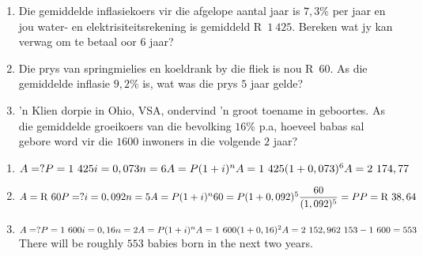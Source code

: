 \begin{exercises}{}{
    \begin{enumerate}[label=\textbf{\arabic*}.]
	\item Die gemiddelde inflasiekoers vir die afgelope aantal jaar is $7,3\%$ per jaar en jou water- en elektrisiteitsrekening is gemiddeld R~$1~425$. Bereken wat jy kan verwag om te betaal oor 6 jaar?

	\item Die prys van springmielies en koeldrank by die fliek is nou R~$60$. As die gemiddelde inflasie $9,2\%$ is, wat was die prys $5$ jaar gelde?

	\item 'n Klien dorpie in Ohio, VSA, ondervind 'n groot toename in geboortes. As die gemiddelde groeikoers van die bevolking $16\%$ p.a, hoeveel babas sal gebore word vir die $1600$ inwoners in die volgende $2$ jaar?
    \end{enumerate}
}
\end{exercises}


 \begin{solutions}{}{
\begin{enumerate}[itemsep=5pt, label=\textbf{\arabic*}. ] 


\item $A = ?\\
P=1~425\\
i=0,073\\
n=6\\
A=P(1 + i)^{n}\\
A = 1~425(1 + 0,073)^{6}\\
A = 2~174,77$
\item $A = \mbox{R }60\\
P=?\\
i=0,092\\
n=5\\
A=P(1 + i)^{n}\\
60 = P(1 + 0,092)^{5}\\
\dfrac{60}{(1,092)^5}=P\\
P = \mbox{R }38,64$
\item $A = ?\\
P=1~600\\
i=0,16\\
n=2\\
A=P(1 + i)^{n}\\
A = 1~600(1 + 0,16)^{2}\\
A = 2~152,96\\
2~153-1~600=553$\\
There will be roughly $553$ babies born in the next two years.
\end{enumerate}}
\end{solutions}


